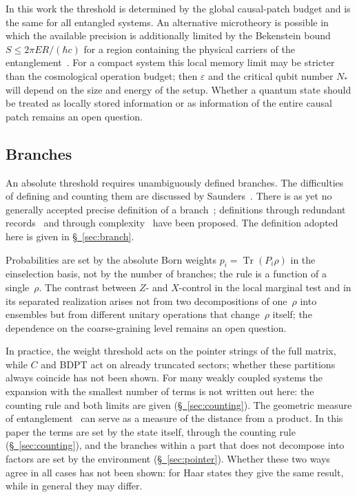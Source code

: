 \documentclass[11pt,a4paper]{article}
\DeclareMathOperator{\Tr}{Tr}
\begin{document}
In this work the threshold is determined by the global causal-patch budget and is the same for all entangled systems. An alternative microtheory is possible in which the available precision is additionally limited by the Bekenstein bound $S\le 2\pi ER/(\hbar c)$ for a region containing the physical carriers of the entanglement~\cite{bousso2002}. For a compact system this local memory limit may be stricter than the cosmological operation budget; then $\varepsilon$ and the critical qubit number $N_*$ will depend on the size and energy of the setup. Whether a quantum state should be treated as locally stored information or as information of the entire causal patch remains an open question.

\subsection{Branches}

An absolute threshold requires unambiguously defined branches. The difficulties of defining and counting them are discussed by Saunders~\cite{saunders2021}. There is as yet no generally accepted precise definition of a branch~\cite{riedel2025}; definitions through redundant records~\cite{riedel2017} and through complexity~\cite{weingarten2022,taylor2025} have been proposed. The definition adopted here is given in \hyperref[sec:branch]{\S~\ref*{sec:branch}}.

Probabilities are set by the absolute Born weights $p_i=\Tr(P_i\rho)$ in the einselection basis, not by the number of branches; the rule is a function of a single~$\rho$. The contrast between $Z$- and $X$-control in the local marginal test and in its separated realization arises not from two decompositions of one~$\rho$ into ensembles but from different unitary operations that change~$\rho$ itself; the dependence on the coarse-graining level remains an open question.

In practice, the weight threshold acts on the pointer strings of the full matrix, while $C$ and BDPT act on already truncated sectors; whether these partitions always coincide has not been shown. For many weakly coupled systems the expansion with the smallest number of terms is not written out here: the counting rule and both limits are given (\hyperref[sec:counting]{\S~\ref*{sec:counting}}). The geometric measure of entanglement~\cite{wei2003} can serve as a measure of the distance from a product. In this paper the terms are set by the state itself, through the counting rule (\hyperref[sec:counting]{\S~\ref*{sec:counting}}), and the branches within a part that does not decompose into factors are set by the environment (\hyperref[sec:pointer]{\S~\ref*{sec:pointer}}). Whether these two ways agree in all cases has not been shown: for Haar states they give the same result, while in general they may differ.
\end{document}
